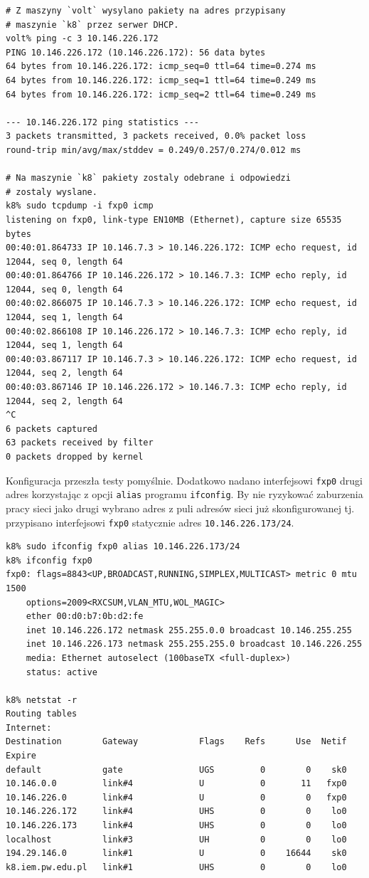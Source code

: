 \begin{lstlisting}
# Z maszyny `volt` wysylano pakiety na adres przypisany
# maszynie `k8` przez serwer DHCP.
volt% ping -c 3 10.146.226.172
PING 10.146.226.172 (10.146.226.172): 56 data bytes
64 bytes from 10.146.226.172: icmp_seq=0 ttl=64 time=0.274 ms
64 bytes from 10.146.226.172: icmp_seq=1 ttl=64 time=0.249 ms
64 bytes from 10.146.226.172: icmp_seq=2 ttl=64 time=0.249 ms

--- 10.146.226.172 ping statistics ---
3 packets transmitted, 3 packets received, 0.0% packet loss
round-trip min/avg/max/stddev = 0.249/0.257/0.274/0.012 ms

# Na maszynie `k8` pakiety zostaly odebrane i odpowiedzi
# zostaly wyslane.
k8% sudo tcpdump -i fxp0 icmp
listening on fxp0, link-type EN10MB (Ethernet), capture size 65535 bytes
00:40:01.864733 IP 10.146.7.3 > 10.146.226.172: ICMP echo request, id 12044, seq 0, length 64
00:40:01.864766 IP 10.146.226.172 > 10.146.7.3: ICMP echo reply, id 12044, seq 0, length 64
00:40:02.866075 IP 10.146.7.3 > 10.146.226.172: ICMP echo request, id 12044, seq 1, length 64
00:40:02.866108 IP 10.146.226.172 > 10.146.7.3: ICMP echo reply, id 12044, seq 1, length 64
00:40:03.867117 IP 10.146.7.3 > 10.146.226.172: ICMP echo request, id 12044, seq 2, length 64
00:40:03.867146 IP 10.146.226.172 > 10.146.7.3: ICMP echo reply, id 12044, seq 2, length 64
^C
6 packets captured
63 packets received by filter
0 packets dropped by kernel
\end{lstlisting}

Konfiguracja przeszła testy pomyślnie. Dodatkowo nadano interfejsowi
\texttt{fxp0} drugi adres korzystając z opcji \texttt{alias} programu
\texttt{ifconfig}. By nie ryzykować zaburzenia pracy sieci jako drugi wybrano
adres z puli adresów sieci już skonfigurowanej tj. przypisano interfejsowi
\texttt{fxp0} statycznie adres \texttt{10.146.226.173/24}.

\begin{lstlisting}
k8% sudo ifconfig fxp0 alias 10.146.226.173/24
k8% ifconfig fxp0
fxp0: flags=8843<UP,BROADCAST,RUNNING,SIMPLEX,MULTICAST> metric 0 mtu 1500
    options=2009<RXCSUM,VLAN_MTU,WOL_MAGIC>
    ether 00:d0:b7:0b:d2:fe
    inet 10.146.226.172 netmask 255.255.0.0 broadcast 10.146.255.255
    inet 10.146.226.173 netmask 255.255.255.0 broadcast 10.146.226.255
    media: Ethernet autoselect (100baseTX <full-duplex>)
    status: active

k8% netstat -r
Routing tables
Internet:
Destination        Gateway            Flags    Refs      Use  Netif Expire
default            gate               UGS         0        0    sk0
10.146.0.0         link#4             U           0       11   fxp0
10.146.226.0       link#4             U           0        0   fxp0
10.146.226.172     link#4             UHS         0        0    lo0
10.146.226.173     link#4             UHS         0        0    lo0
localhost          link#3             UH          0        0    lo0
194.29.146.0       link#1             U           0    16644    sk0
k8.iem.pw.edu.pl   link#1             UHS         0        0    lo0
\end{lstlisting}

